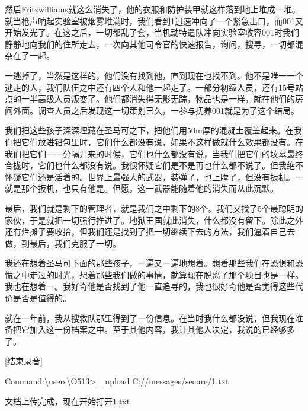 然后Fritzwilliams就这么消失了，他的衣服和防护装甲就这样落到地上堆成一堆。就当枪声响起实验室被烟雾堆满时，我们看到1迅速冲向了一个紧急出口，而001又开始发光了。在这之后，一切都乱了套，当机动特遣队冲向实验室收容001时我们静静地向我们的住所走去，一次向其他司令官的快速报告，询问，搜寻，一切都混杂在了一起。

一逃掉了，当然是这样的，他们没有找到他，直到现在也找不到。他不是唯一一个逃走的人，我们队伍之中还有四个人和他一起走了。一部分初级人员，还有15号站点的一半高级人员叛变了。他们都消失得无影无踪，物品也是一样，就在他们的房间外面。调查人员之后发现这一切策划已久，一参与抚养001就是为了这个结局。

我们把这些孩子深深埋藏在圣马可之下，把他们用50m厚的混凝土覆盖起来。在我们把它们放进铅包里时，它们什么都没有说，如果不这样做就什么效果都没有。在我们把它们一一分隔开来的时候，它们也什么都没有说，当我们把它们的坟墓最终合拢时，它们也什么都没有说。我很怀疑它们是不是再也什么都不说了。但我绝不怀疑它们还是活着的。世界上最强大的武器，装弹了，也上膛了，但没有扳机。一就是那个扳机，也只有他是。但愿，这一武器能随着他的消失而从此沉默。

最后，我们就是剩下的管理者，就是我们之中剩下的8个。我们又找了5个最聪明的家伙，于是就把一切强行推进了。地狱王国就此消失，什么都没有留下。除此之外还有烂摊子要收拾，但我们还是找到了把一切继续下去的方法，我们逼着自己去做，到最后，我们克服了一切。

我还在想着圣马可下面的那些孩子，一遍又一遍地想着。想着那些我们在恐惧和恐慌之中走过的时光，想着那些我们做的事情，就算现在脱离了那个项目也是一样。我也在想着一。我好奇他是否找到了他一直追寻的，我也很好奇他是否觉得这些代价是否是值得的。

就在一年前，我从搜救队那里得到了一份信息。在当时我什么都没说，但我现在准备把它加入这一份档案之中。至于其他内容，我让其他人决定，我说的已经够多了。

[结束录音]

\begin{scpboxc}
Command:\textbackslash users\textbackslash O513>\_ upload C://messages/secure/1.txt
\end{scpboxc}


\begin{scpboxc}
文档上传完成，现在开始打开1.txt
\end{scpboxc}


